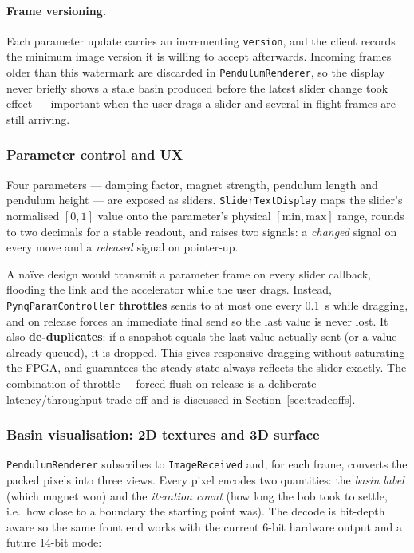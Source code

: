 \documentclass[11pt,a4paper]{article}
\begin{document}
\paragraph{Frame versioning.}
Each parameter update carries an incrementing \texttt{version}, and the client
records the minimum image version it is willing to accept afterwards. Incoming
frames older than this watermark are discarded in \texttt{PendulumRenderer}, so
the display never briefly shows a stale basin produced before the latest slider
change took effect --- important when the user drags a slider and several
in-flight frames are still arriving.

\subsubsection{Parameter control and UX}
\label{sec:params}

Four parameters --- damping factor, magnet strength, pendulum length and
pendulum height --- are exposed as sliders. \texttt{SliderTextDisplay} maps the
slider's normalised $[0,1]$ value onto the parameter's physical
$[\text{min},\text{max}]$ range, rounds to two decimals for a stable readout,
and raises two signals: a \emph{changed} signal on every move and a
\emph{released} signal on pointer-up.

A na\"ive design would transmit a parameter frame on every slider callback,
flooding the link and the accelerator while the user drags. Instead,
\texttt{PynqParamController} \textbf{throttles} sends to at most one every
\SI{0.1}{s} while dragging, and on release forces an immediate final send so the
last value is never lost. It also \textbf{de-duplicates}: if a snapshot equals
the last value actually sent (or a value already queued), it is dropped. This
gives responsive dragging without saturating the FPGA, and guarantees the steady
state always reflects the slider exactly. The combination of throttle +
forced-flush-on-release is a deliberate latency/throughput trade-off and is
discussed in Section~\ref{sec:tradeoffs}.

\subsubsection{Basin visualisation: 2D textures and 3D surface}
\label{sec:pixeldecode}

\texttt{PendulumRenderer} subscribes to \texttt{ImageReceived} and, for each
frame, converts the packed pixels into three views. Every pixel encodes two
quantities: the \emph{basin label} (which magnet won) and the \emph{iteration
count} (how long the bob took to settle, i.e.\ how close to a boundary the
starting point was). The decode is bit-depth aware so the same front end works
with the current 6-bit hardware output and a future 14-bit mode:
\end{document}
